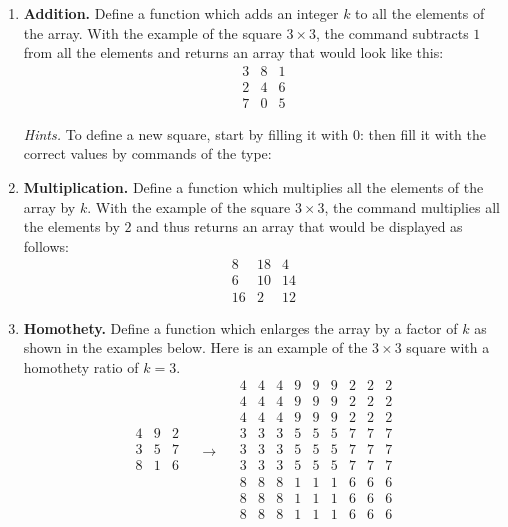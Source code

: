 \documentclass[11pt,class=report,crop=false]{standalone}
\begin{document}
\begin{activite}
\begin{enumerate}
  
  \item \textbf{Addition.} Define a function 
  which adds an integer $k$ to all the elements of the array. With the example of the square $3\times 3$, the command  subtracts $1$ from all the elements and returns an array that would look like this:
$$\begin{array}{ccc}
3&8&1\\2&4&6\\7&0&5
\end{array}$$  

\emph{Hints.} To define a new square, start by filling it with $0$:
then fill it with the correct values by commands of the type:

  \item \textbf{Multiplication.} Define a function 
  which multiplies all the elements of the array by $k$. With the example of the square $3\times 3$, the command  multiplies all the elements by $2$ and thus returns an array that would be displayed as follows:
$$\begin{array}{ccc}
8&18&4\\6&10&14\\16&2&12
\end{array}$$ 
  
  \item \textbf{Homothety.} Define a function 
  which enlarges the array by a factor of $k$ as shown in the examples below. 
  Here is an example of the $3 \times 3$ square with a homothety ratio of $k=3$.
 $$
  \begin{array}{c|c|c}  
  4& 9& 2\\\hline
  3& 5& 7\\\hline
  8& 1& 6\\  
  \end{array} 
\quad  \longrightarrow\quad
  \begin{array}{ccc|ccc|ccc}  
  4& 4& 4& 9& 9& 9& 2& 2& 2\\
  4& 4& 4& 9& 9& 9& 2& 2& 2\\ 
  4& 4& 4& 9& 9& 9& 2& 2& 2\\\hline
  3& 3& 3& 5& 5& 5& 7& 7& 7\\
  3& 3& 3& 5& 5& 5& 7& 7& 7\\
  3& 3& 3& 5& 5& 5& 7& 7& 7\\\hline
  8& 8& 8& 1& 1& 1& 6& 6& 6\\
  8& 8& 8& 1& 1& 1& 6& 6& 6\\
  8& 8& 8& 1& 1& 1& 6& 6& 6 \\
  \end{array}
$$
  

\end{enumerate}
\end{activite}
\end{document}
